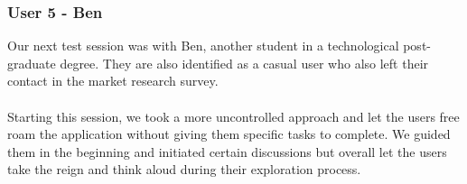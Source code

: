 \newpage
\subsubsection{User 5 - Ben}
Our next test session was with Ben, another student in a technological post-graduate degree. They are also identified as a casual user who also left their contact in the market research survey.\\\\
Starting this session, we took a more uncontrolled approach and let the users free roam the application without giving them specific tasks to complete. We guided them in the beginning and initiated certain discussions but overall let the users take the reign and think aloud during their exploration process.\\\\
